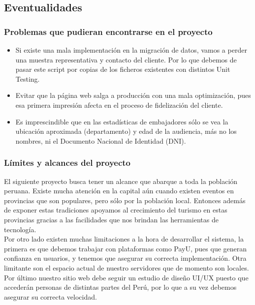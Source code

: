 \subsection{Eventualidades}
\subsubsection{Problemas que pudieran encontrarse en el proyecto}
\begin{itemize}
    \item Si existe una mala implementación en la migración de datos, vamos a perder una muestra representativa y contacto del cliente. Por lo que debemos de pasar este script por copias de los ficheros existentes con distintos Unit Testing.
    \item Evitar que la página web salga a producción con una mala optimización, pues esa primera impresión afecta en el proceso de fidelización del cliente.
    \item Es imprescindible que en las estadísticas de embajadores sólo se vea la ubicación aproximada (departamento) y edad de la audiencia, más no los nombres, ni el Documento Nacional de Identidad (DNI). 
\end{itemize}

\subsubsection{Límites y alcances del proyecto}
El siguiente proyecto busca tener un alcance que abarque a toda la población peruana. Existe mucha atención en la capital aún cuando existen eventos en provincias que son populares, pero sólo por la población local. Entonces además de exponer estas tradiciones apoyamos al crecimiento del turismo en estas provincias gracias a las facilidades que nos brindan las herramientas de tecnología.\\

Por otro lado existen muchas limitaciones a la hora de desarrollar el sistema, la primera es que debemos trabajar con plataformas como PayU, pues que generan confianza en usuarios, y tenemos que asegurar su correcta implementación. Otra limitante son el espacio actual de nuestro servidores que de momento son locales. Por último nuestro sitio web debe seguir un estudio de diseño UI/UX puesto que accederán personas de distintas partes del Perú, por lo que a su vez debemos asegurar su correcta velocidad. 
